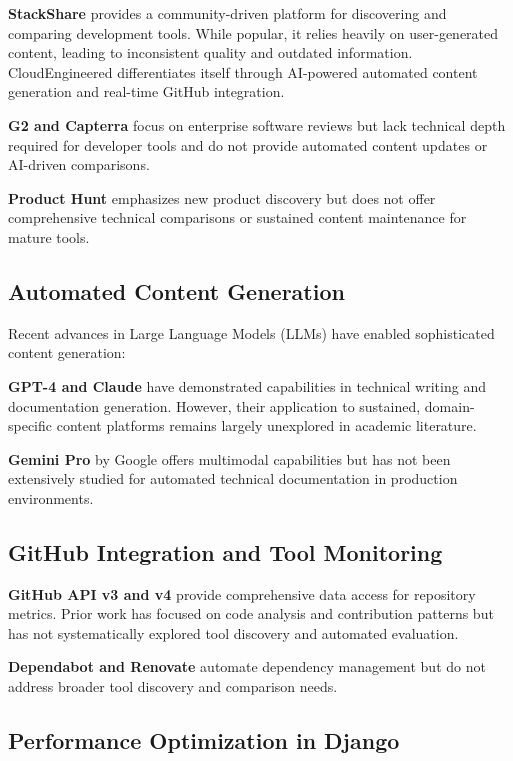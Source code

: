 \documentclass[conference]{IEEEtran}
\begin{document}
\textbf{StackShare} \cite{stackshare2024} provides a community-driven platform for discovering and comparing development tools. While popular, it relies heavily on user-generated content, leading to inconsistent quality and outdated information. CloudEngineered differentiates itself through AI-powered automated content generation and real-time GitHub integration.

\textbf{G2 and Capterra} focus on enterprise software reviews but lack technical depth required for developer tools and do not provide automated content updates or AI-driven comparisons.

\textbf{Product Hunt} emphasizes new product discovery but does not offer comprehensive technical comparisons or sustained content maintenance for mature tools.

\subsection{Automated Content Generation}

Recent advances in Large Language Models (LLMs) have enabled sophisticated content generation:

\textbf{GPT-4 and Claude} \cite{openai2023gpt4} have demonstrated capabilities in technical writing and documentation generation. However, their application to sustained, domain-specific content platforms remains largely unexplored in academic literature.

\textbf{Gemini Pro} \cite{google2023gemini} by Google offers multimodal capabilities but has not been extensively studied for automated technical documentation in production environments.

\subsection{GitHub Integration and Tool Monitoring}

\textbf{GitHub API v3 and v4} \cite{github2024api} provide comprehensive data access for repository metrics. Prior work has focused on code analysis and contribution patterns but has not systematically explored tool discovery and automated evaluation.

\textbf{Dependabot and Renovate} automate dependency management but do not address broader tool discovery and comparison needs.

\subsection{Performance Optimization in Django}
\end{document}
